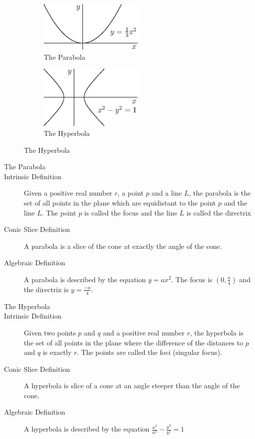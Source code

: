 \documentclass[fleqn]{report}
\begin{document}
\begin{figure}[b]
\centering
\begin{subfigure}{.5\textwidth}
 \centering
 \includegraphics[width=5cm]{figure05.eps}
 \caption{The Parabola}
\end{subfigure}%
\begin{subfigure}{.5\textwidth}
 \centering
 \includegraphics[width=5cm]{figure04.eps}
 \caption{The Hyperbola}
\end{subfigure}
\label{figure-conics2}
\end{figure}

\begin{description}
\item[The Parabola]
\item[Intrinsic Definition] Given a positive real number $r$,
a point $p$ and a line $L$, the parabola is the set of all
points in the plane which are equidistant to the point $p$
and the line $L$. The point $p$ is called the focus and the
line $L$ is called the directrix
\item[Conic Slice Definition] A parabola is a slice of the cone
at exactly the angle of the cone.
\item[Algebraic Definition] A parabola is described by the
equation $y = ax^2$. The focus is $(0,\frac{a}{4})$ and the
directrix is $y=\frac{-a}{4}$. 
\end{description}

\begin{description}
\item[The Hyperbola]
\item[Intrinsic Definition] Given two points $p$ and $q$ and a
positive real number $r$, the hyperbola is the set of all points
in the plane where the difference of the distances to $p$ and $q$ is
exactly $r$. The points are called the foci (singular focus). 
\item[Conic Slice Definition] A hyperbola is slice of a cone at
an angle steeper than the angle of the cone.
\item[Algebraic Definition] A hyperbola is described by the
equation $\frac{x^2}{a^2} - \frac{y^2}{b^2} = 1$
\end{description}
\end{document}
